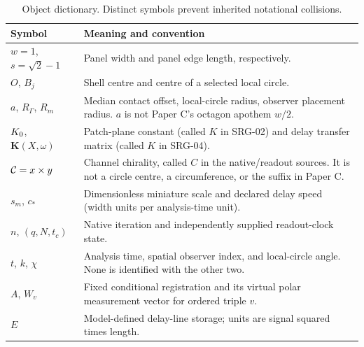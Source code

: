 \documentclass[11pt,a4paper]{article}
\begin{document}
\begin{table}[htbp]\centering\small
\caption{Object dictionary. Distinct symbols prevent inherited notational collisions.}
\begin{tabular}{@{}p{40mm}p{113mm}@{}}\toprule
Symbol & Meaning and convention\\\midrule
$w=1$, $s=\sqrt2-1$ & Panel width and panel edge length, respectively.\\
$O$, $B_j$ & Shell centre and centre of a selected local circle.\\
$a$, $R_\Gamma$, $R_m$ & Median contact offset, local-circle radius, observer placement radius. $a$ is not Paper C's octagon apothem $w/2$.\\
$K_0$, $\mathbf K(X,\omega)$ & Patch-plane constant (called $K$ in SRG-02) and delay transfer matrix (called $K$ in SRG-04).\\
$\mathcal C=x\times y$ & Channel chirality, called $C$ in the native/readout sources. It is not a circle centre, a circumference, or the suffix in Paper C.\\
$s_m$, $c_*$ & Dimensionless miniature scale and declared delay speed (width units per analysis-time unit).\\
$n$, $(q,N,t_c)$ & Native iteration and independently supplied readout-clock state.\\
$t$, $k$, $\chi$ & Analysis time, spatial observer index, and local-circle angle. None is identified with the other two.\\
$A$, $W_v$ & Fixed conditional registration and its virtual polar measurement vector for ordered triple $v$.\\
$E$ & Model-defined delay-line storage; units are signal squared times length.\\\bottomrule
\end{tabular}\label{tab:notation}
\end{table}


\clearpage




\end{document}
